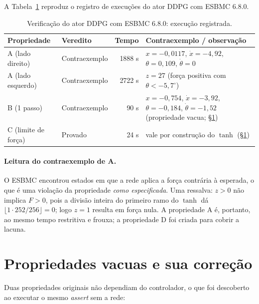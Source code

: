 \documentclass[12pt,openright,oneside,a4paper,chapter=TITLE,sumario=tradicional,english,brazil]{abntex2}
\begin{document}
A Tabela~\ref{tab:ddpg} reproduz o registro de execuções do ator DDPG com ESBMC 6.8.0.

\begin{table}[htb]
\caption{Verificação do ator DDPG com ESBMC 6.8.0: execução registrada.}\label{tab:ddpg}
\centering
\begin{tabular}{l|l|r|p{6.0cm}}
\toprule
\textbf{Propriedade} & \textbf{Veredito} & \textbf{Tempo} & \textbf{Contraexemplo / observação} \\
\midrule
A (lado direito)    & Contraexemplo & 1888 s & $x{=}-0{,}0117$, $\dot x{=}-4{,}92$, $\theta{=}0{,}109$, $\dot\theta{=}0$ \\
A (lado esquerdo)   & Contraexemplo & 2722 s & $z=27$ (força positiva com $\theta<-5{,}7^\circ$) \\
B (1 passo)         & Contraexemplo & 90 s   & $x{=}-0{,}754$, $\dot x{=}-3{,}92$, $\theta{=}-0{,}184$, $\dot\theta{=}-1{,}52$ (propriedade vacua; \S\ref{sec:vac}) \\
C (limite de força) & Provado       & 24 s   & vale por construção do $\tanh$ (\S\ref{sec:vac}) \\
\bottomrule
\end{tabular}
\end{table}

\paragraph{Leitura do contraexemplo de A.} O ESBMC encontrou estados em que a rede aplica a força contrária à esperada, o que é uma violação da propriedade \emph{como especificada}. Uma ressalva: $z>0$ não implica $F>0$, pois a divisão inteira do primeiro ramo do $\tanh$ dá $\lfloor 1\cdot252/256\rfloor=0$; logo $z=1$ resulta em força nula. A propriedade A é, portanto, ao mesmo tempo restritiva e frouxa; a propriedade D foi criada para cobrir a lacuna.

\section{Propriedades vacuas e sua correção}\label{sec:vac}

Duas propriedades originais não dependiam do controlador, o que foi descoberto ao executar o mesmo \emph{assert} sem a rede:
\end{document}
